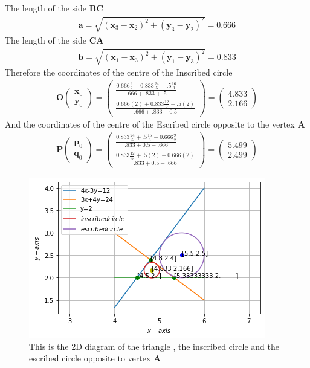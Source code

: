 \documentclass[journal,12pt,twocolumn]{IEEEtran}
\newcommand{\myvec}[1]{\ensuremath{\begin{pmatrix}#1\end{pmatrix}}}
\numberwithin{equation}{subsection}
\let\vec\mathbf
\begin{document}
 The length of the side $\vec{BC}$
 \begin{align}
 \vec{a}=\sqrt{(\vec{x}_3-\vec{x}_2)^2+(\vec{y}_3-\vec{y}_2)^2}=0.666
 \end{align}
  The length of the side $\vec{CA}$ 
 \begin{align}
\vec{b}=\sqrt{(\vec{x}_1-\vec{x}_3)^2+(\vec{y}_1-\vec{y}_3)^2}=0.833
 \end{align}
Therefore the coordinates of the centre of the Inscribed circle
 \begin{align}
 \vec{O}\myvec{\vec{x}_0 \\\vec{y}_0}=\myvec{\frac{0.666\frac{9}{2}+ 0.833\frac{24}{5}+.5\frac{16}{3}}{.666+.833+.5}\\ \frac{0.666(2)+ 0.833\frac{12}{5}+.5(2)}{.666+.833+0.5}}={\myvec{4.833\\2.166}}
 \end{align} 
And the coordinates of the centre of the Escribed circle  opposite to the vertex $\vec{A}$
 \begin{align}
\vec{P}\myvec{\vec{p}_0 \\\vec{q}_0}=\myvec{\frac{0.833\frac{24}{5}+.5\frac{16}{3}-0.666\frac{9}{2}}{.833+0.5-.666}\\ \frac{0.833\frac{12}{5}+.5(2)-0.666(2)}{.833+0.5-.666}}={\myvec{5.499\\2.499}}
 \end{align}

\begin{figure}[!]
 \begin{center}
  \includegraphics[width=\columnwidth]{assignment4/assignment4_fig.png}
    \caption{This is the 2D diagram of the triangle , the inscribed circle and the escribed circle opposite to vertex $\vec{A}$}
    \label{myfig:1}
    \end{center}
\end{figure}
\end{document}
